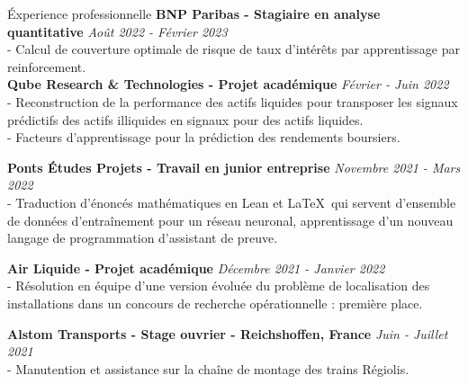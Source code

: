\documentclass{resume} %
\begin{document}
\begin{rSection}{\'Experience professionnelle}
{\bf BNP Paribas - Stagiaire en analyse quantitative} \hfill {\em Août 2022 - Février 2023} 
\\
- Calcul de couverture optimale de risque de taux d'intérêts par apprentissage par reinforcement.
\\
{\bf Qube Research \& Technologies - Projet académique} \hfill {\em Février - Juin 2022} 
\\
- Reconstruction de la performance des actifs liquides pour transposer les signaux prédictifs des actifs illiquides en signaux pour des actifs liquides.
\\
- Facteurs d'apprentissage pour la prédiction des rendements boursiers.

{\bf Ponts \'Etudes Projets - Travail en junior entreprise} \hfill {\em Novembre 2021 - Mars 2022} 
\\
- Traduction d'énoncés mathématiques en Lean et \LaTeX ~qui servent d'ensemble de données d'entraînement pour un réseau neuronal, apprentissage d'un nouveau langage de programmation d'assistant de preuve. 

{\bf Air Liquide - Projet académique} \hfill {\em Décembre 2021 - Janvier 2022} 
\\
- Résolution en équipe d'une version évoluée du problème de localisation des installations dans un concours de recherche opérationnelle : première place.

{\bf Alstom Transports - Stage ouvrier - Reichshoffen, France} \hfill {\em Juin - Juillet 2021} 
\\- Manutention et assistance sur la chaîne de montage des trains Régiolis.


\end{rSection}
\end{document}
